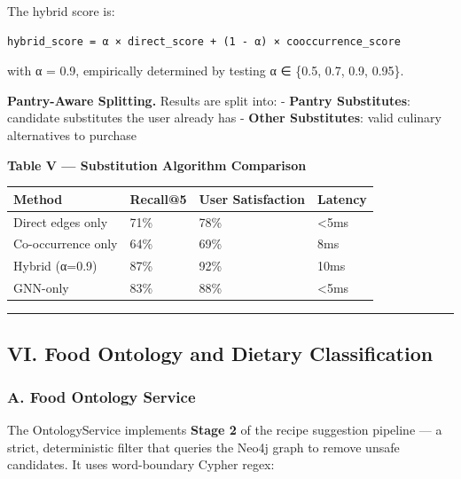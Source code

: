 \documentclass[10pt,conference,compsoc]{IEEEtran}
\begin{document}
The hybrid score is:

\begin{lstlisting}
hybrid_score = α × direct_score + (1 - α) × cooccurrence_score
\end{lstlisting}

with α = 0.9, empirically determined by testing α ∈ \{0.5, 0.7, 0.9,
0.95\}.

\textbf{Pantry-Aware Splitting.} Results are split into: -
\textbf{Pantry Substitutes}: candidate substitutes the user already has
- \textbf{Other Substitutes}: valid culinary alternatives to purchase

\textbf{Table V --- Substitution Algorithm Comparison}

\begin{longtable}[]{@{}llll@{}}
\toprule\noalign{}
Method & Recall@5 & User Satisfaction & Latency \\
\midrule\noalign{}
\endhead
\bottomrule\noalign{}
\endlastfoot
Direct edges only & 71\% & 78\% & \textless5ms \\
Co-occurrence only & 64\% & 69\% & 8ms \\
Hybrid (α=0.9) & 87\% & 92\% & 10ms \\
GNN-only & 83\% & 88\% & \textless5ms \\
\end{longtable}

\begin{center}\rule{0.5\linewidth}{0.5pt}\end{center}

\subsection{VI. Food Ontology and Dietary
Classification}\label{vi.-food-ontology-and-dietary-classification}

\subsubsection{A. Food Ontology Service}\label{a.-food-ontology-service}

The OntologyService implements \textbf{Stage 2} of the recipe suggestion
pipeline --- a strict, deterministic filter that queries the Neo4j graph
to remove unsafe candidates. It uses word-boundary Cypher regex:

\begin{Shaded}
\begin{Highlighting}[]
\NormalTok{  )}
\NormalTok{)}
\end{Highlighting}
\end{Shaded}
\end{document}
